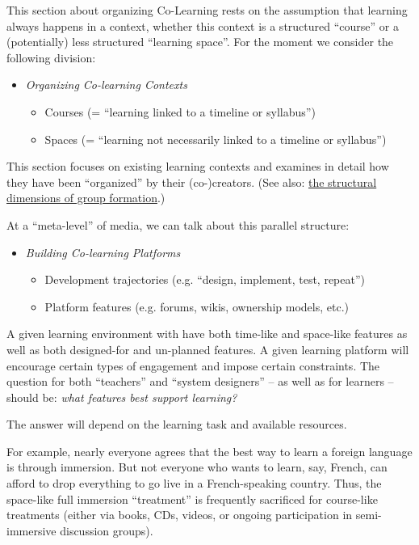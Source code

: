 This section about organizing Co-Learning rests on the assumption that
learning always happens in a context, whether this context is a
structured ``course'' or a (potentially) less structured ``learning
space''. For the moment we consider the following division:

\begin{itemize}
\item
  \emph{Organizing Co-learning Contexts}

  \begin{itemize}
  \item
    Courses (= ``learning linked to a timeline or syllabus'')
  \item
    Spaces (= ``learning not necessarily linked to a timeline or
    syllabus'')
  \end{itemize}
\end{itemize}

This section focuses on existing learning contexts and examines in
detail how they have been ``organized'' by their (co-)creators. (See
also:
\href{http://socialmediaclassroom.com/host/peeragogy/wiki/structural-dimensions-the-what-we-are-learning-vs-time-and-types-structures}{the
structural dimensions of group formation}.)

At a ``meta-level'' of media, we can talk about this parallel structure:

\begin{itemize}
\item
  \emph{Building Co-learning Platforms}

  \begin{itemize}
  \item
    Development trajectories (e.g. ``design, implement, test, repeat'')
  \item
    Platform features (e.g. forums, wikis, ownership models, etc.)
  \end{itemize}
\end{itemize}

A given learning environment with have both time-like and space-like
features as well as both designed-for and un-planned features. A given
learning platform will encourage certain types of engagement and impose
certain constraints. The question for both ``teachers'' and ``system
designers'' -- as well as for learners -- should be: \emph{what features
best support learning?}

The answer will depend on the learning task and available resources.

For example, nearly everyone agrees that the best way to learn a foreign
language is through immersion. But not everyone who wants to learn, say,
French, can afford to drop everything to go live in a French-speaking
country. Thus, the space-like full immersion ``treatment'' is frequently
sacrificed for course-like treatments (either via books, CDs, videos, or
ongoing participation in semi-immersive discussion groups).

